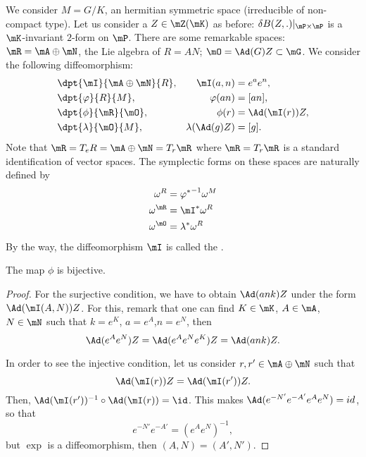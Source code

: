 We consider $M=G/K$, an hermitian symmetric space (irreducible of non-compact type). Let us consider a $Z\in\mZ(\mK)$ as before: $\delta B(Z,.)|_{\mP\times\mP}$ is a $\mK$-invariant $2$-form on $\mP$.
There are some remarkable spaces: $\mR=\mA\oplus\mN$, the Lie algebra of $R=AN$; $\mO=\Ad(G)Z\subset\mG$. We consider the following diffeomorphism:
\begin{subequations}
\begin{align}
&\dpt{\mI}{\mA\oplus\mN}{R},  &\mI(a,n)&=e^ae^n,\\
&\dpt{\varphi}{R}{M},             &\varphi(an)&=[an],\\
&\dpt{\phi}{\mR}{\mO},        &\phi(r)&=\Ad(\mI(r))Z,\\
&\dpt{\lambda}{\mO}{M},       &\lambda(\Ad(g)Z)&=[g].
\end{align}
\end{subequations}
Note that $\mR=T_eR=\mA\oplus\mN=T_r\mR$ where $\mR=T_r\mR$ is a standard identification of vector spaces. The symplectic forms on these spaces are naturally defined by
\begin{subequations}
\begin{align}
   \omega^R&={\varphi^*}^{-1}\omega^M\\
   \omega^{\mR}&=\mI^*\omega^R\\
   \omega^{\mO}&=\lambda^*\omega^R
\end{align}
\end{subequations}
%
By the way, the diffeomorphism $\mI$ is called the .

\begin{proposition}
The map $\phi$ is bijective.
\end{proposition}

\begin{proof}
For the surjective condition, we have to obtain $\Ad(ank)Z$ under the form $\Ad(\mI(A,N))Z$. For this, remark that one can find $K\in\mK$, $A\in\mA$, $N\in\mN$  such that $k=e^K$, $a=e^A$,$n=e^N$, then
\[
  \Ad(e^Ae^N)Z=\Ad(e^Ae^Ne^K)Z=\Ad(ank)Z.
\]

In order to see the injective condition, let us consider $r,r'\in\mA\oplus\mN$ such that
\[
  \Ad(\mI(r))Z=\Ad(\mI(r'))Z.
\]
Then, $\Ad(\mI(r'))^{-1}\circ\Ad(\mI(r))=\id$. This makes $\Ad(e^{-N'}e^{-A'}e^Ae^N)=id$, so that
\[
   e^{-N'}e^{-A'}=\left(e^Ae^N\right)^{-1},
\]
but $\exp$ is a diffeomorphism, then $(A,N)=(A',N')$.

\end{proof}


